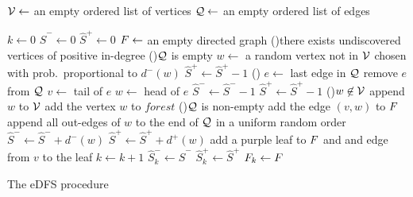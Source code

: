 \begin{algorithm}[htbp]
    \SetAlgoLined
    $\mathcal V \leftarrow$ an empty ordered list of vertices \;
    $\mathcal Q \leftarrow$ an empty ordered list of edges \;

    $k \leftarrow 0$  \;
    $\hat{S}^- \leftarrow 0$ \;
    $\hat{S}^+ \leftarrow 0$  \;
    $F \leftarrow$ an empty directed graph \;
    \While(){there exists undiscovered vertices of positive in-degree}{
        \eIf(){$\mathcal Q$ is empty}{
            $w \leftarrow$ a random vertex not in $\mathcal V$ chosen with prob.\ proportional to $d^-(w)$ \;
            $\hat{S}^+ \leftarrow \hat{S}^+ - 1$  \;
        }(){
            $e \leftarrow$ last edge in $\mathcal Q$ \;
            remove $e$ from $\mathcal Q$ \;
            $v \leftarrow$ tail of $e$\;
            $w \leftarrow$ head of $e$ \;
            $\hat{S}^- \leftarrow \hat{S}^- - 1$  \;
            $\hat{S}^+ \leftarrow \hat{S}^+ - 1$  \;
        }
        \eIf(){$w \not \in \mathcal V$}{
            append $w$ to $\mathcal V$ \; 
            add the vertex $w$ to $forest$ \;
            \If(){$\mathcal Q$ is non-empty}{
                add the edge $(v, w)$ to $F$\;
            }
            append all out-edges of $w$ to the end of $\mathcal Q$ in a uniform random order \;
            $\hat{S}^- \leftarrow \hat{S}^- + d^-(w)$  \;
            $\hat{S}^+ \leftarrow \hat{S}^+ + d^+(w)$ \;
        }{
            add a purple leaf to $F$ and and edge from $v$ to the leaf \;
        }
        $k \leftarrow k + 1$ \;
        $\hat{S}^-_k \leftarrow \hat{S}^-$ \;
        $\hat{S}^+_k \leftarrow \hat{S}^+$ \;
        $F_k \leftarrow F$ \;
    }
    \caption{The eDFS procedure \label{alg:edfs}}
\end{algorithm}

